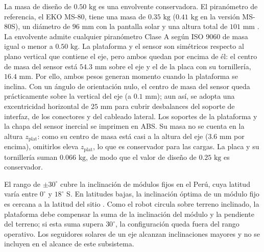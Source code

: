 \documentclass[../../General.tex]{subfiles}
\begin{document}
La masa de diseño de $0.50\text{ kg}$ es una envolvente conservadora. El piranómetro de referencia, el EKO MS-80, tiene una masa de $0.35\text{ kg}$ ($0.41\text{ kg}$ en la versión MS-80S), un diámetro de $96\text{ mm}$ con la pantalla solar y una altura total de $101\text{ mm}$ \citep{eko_ms80_2023}. La envolvente admite cualquier piranómetro Clase A según ISO 9060 \citep{iso9060_2018} de masa igual o menor a $0.50\text{ kg}$. La plataforma y el sensor son simétricos respecto al plano vertical que contiene el eje, pero ambos quedan por encima de él: el centro de masa del sensor está $54.3\text{ mm}$ sobre el eje y el de la placa con su tornillería, $16.4\text{ mm}$. Por ello, ambos pesos generan momento cuando la plataforma se inclina. Con un ángulo de orientación nulo, el centro de masa del sensor queda prácticamente sobre la vertical del eje (a $0.1\text{ mm}$); aun así, se adopta una excentricidad horizontal de $25\text{ mm}$ para cubrir desbalances del soporte de interfaz, de los conectores y del cableado lateral. Los soportes de la plataforma y la chapa del sensor inercial se imprimen en ABS. Su masa no se cuenta en la altura $z_{\text{plat}}$: como su centro de masa está casi a la altura del eje ($3.6\text{ mm}$ por encima), omitirlos eleva $z_{\text{plat}}$, lo que es conservador para las cargas. La placa y su tornillería suman $0.066\text{ kg}$, de modo que el valor de diseño de $0.25\text{ kg}$ es conservador.

El rango de $\pm 30^\circ$ cubre la inclinación de módulos fijos en el Perú, cuya latitud varía entre $0^\circ$ y $18^\circ$ S. En latitudes bajas, la inclinación óptima de un módulo fijo es cercana a la latitud del sitio \citep{jacobson2018tilt}. Como el robot circula sobre terreno inclinado, la plataforma debe compensar la suma de la inclinación del módulo y la pendiente del terreno; si esta suma supera $30^\circ$, la configuración queda fuera del rango operativo. Los seguidores solares de un eje alcanzan inclinaciones mayores y no se incluyen en el alcance de este subsistema.
\end{document}
